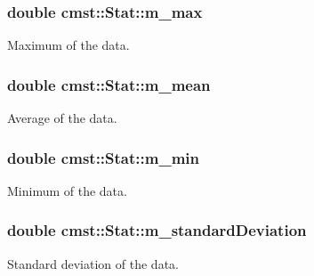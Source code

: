 \subsubsection[{\texorpdfstring{m\+\_\+max}{m_max}}]{\setlength{\rightskip}{0pt plus 5cm}double cmst\+::\+Stat\+::m\+\_\+max\hspace{0.3cm}{\ttfamily [private]}}\hypertarget{classcmst_1_1_stat_a93f52caf45b449d34c87fcbb0ebaa93e}{}\label{classcmst_1_1_stat_a93f52caf45b449d34c87fcbb0ebaa93e}


Maximum of the data. 

\subsubsection[{\texorpdfstring{m\+\_\+mean}{m_mean}}]{\setlength{\rightskip}{0pt plus 5cm}double cmst\+::\+Stat\+::m\+\_\+mean\hspace{0.3cm}{\ttfamily [private]}}\hypertarget{classcmst_1_1_stat_a0fc650572d2cea2bae2190188f3a03cf}{}\label{classcmst_1_1_stat_a0fc650572d2cea2bae2190188f3a03cf}


Average of the data. 

\subsubsection[{\texorpdfstring{m\+\_\+min}{m_min}}]{\setlength{\rightskip}{0pt plus 5cm}double cmst\+::\+Stat\+::m\+\_\+min\hspace{0.3cm}{\ttfamily [private]}}\hypertarget{classcmst_1_1_stat_a2f503d58c0bc9eed8bd6d2c46edffbf4}{}\label{classcmst_1_1_stat_a2f503d58c0bc9eed8bd6d2c46edffbf4}


Minimum of the data. 

\subsubsection[{\texorpdfstring{m\+\_\+standard\+Deviation}{m_standardDeviation}}]{\setlength{\rightskip}{0pt plus 5cm}double cmst\+::\+Stat\+::m\+\_\+standard\+Deviation\hspace{0.3cm}{\ttfamily [private]}}\hypertarget{classcmst_1_1_stat_aa6321c420c546603588be13de4628957}{}\label{classcmst_1_1_stat_aa6321c420c546603588be13de4628957}


Standard deviation of the data. 

